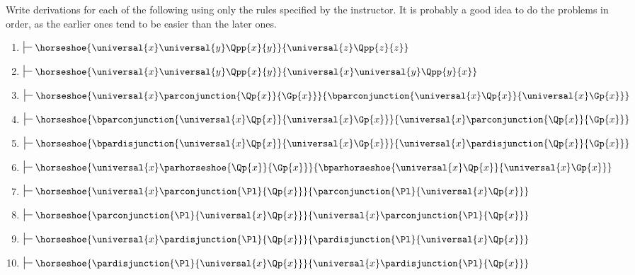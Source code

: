 Write derivations for each of the following using only the rules specified by the instructor. 
It is probably a good idea to do the problems in order, as the earlier ones tend to be easier than the later ones. 
\begin{multicols}{2}
\begin{enumerate}
\item $\sststile{}{}\horseshoe{\universal{\variable{x}}\universal{\variable{y}}\Qpp{\variable{x}}{\variable{y}}}{\universal{\variable{z}}\Qpp{\variable{z}}{\variable{z}}}$
\item $\sststile{}{}\horseshoe{\universal{\variable{x}}\universal{\variable{y}}\Qpp{\variable{x}}{\variable{y}}}{\universal{\variable{x}}\universal{\variable{y}}\Qpp{\variable{y}}{\variable{x}}}$
\item $\sststile{}{}\horseshoe{\universal{\variable{x}}\parconjunction{\Qp{\variable{x}}}{\Gp{\variable{x}}}}{\bparconjunction{\universal{\variable{x}}\Qp{\variable{x}}}{\universal{\variable{x}}\Gp{\variable{x}}}}$
\item $\sststile{}{}\horseshoe{\bparconjunction{\universal{\variable{x}}\Qp{\variable{x}}}{\universal{\variable{x}}\Gp{\variable{x}}}}{\universal{\variable{x}}\parconjunction{\Qp{\variable{x}}}{\Gp{\variable{x}}}}$
\item $\sststile{}{}\horseshoe{\bpardisjunction{\universal{\variable{x}}\Qp{\variable{x}}}{\universal{\variable{x}}\Gp{\variable{x}}}}{\universal{\variable{x}}\pardisjunction{\Qp{\variable{x}}}{\Gp{\variable{x}}}}$
\item $\sststile{}{}\horseshoe{\universal{\variable{x}}\parhorseshoe{\Qp{\variable{x}}}{\Gp{\variable{x}}}}{\bparhorseshoe{\universal{\variable{x}}\Qp{\variable{x}}}{\universal{\variable{x}}\Gp{\variable{x}}}}$
\item $\sststile{}{}\horseshoe{\universal{\variable{x}}\parconjunction{\Pl}{\Qp{\variable{x}}}}{\parconjunction{\Pl}{\universal{\variable{x}}\Qp{\variable{x}}}}$
\item $\sststile{}{}\horseshoe{\parconjunction{\Pl}{\universal{\variable{x}}\Qp{\variable{x}}}}{\universal{\variable{x}}\parconjunction{\Pl}{\Qp{\variable{x}}}}$

\item $\sststile{}{}\horseshoe{\universal{\variable{x}}\pardisjunction{\Pl}{\Qp{\variable{x}}}}{\pardisjunction{\Pl}{\universal{\variable{x}}\Qp{\variable{x}}}}$
\item $\sststile{}{}\horseshoe{\pardisjunction{\Pl}{\universal{\variable{x}}\Qp{\variable{x}}}}{\universal{\variable{x}}\pardisjunction{\Pl}{\Qp{\variable{x}}}}$


\end{enumerate}
\end{multicols}
